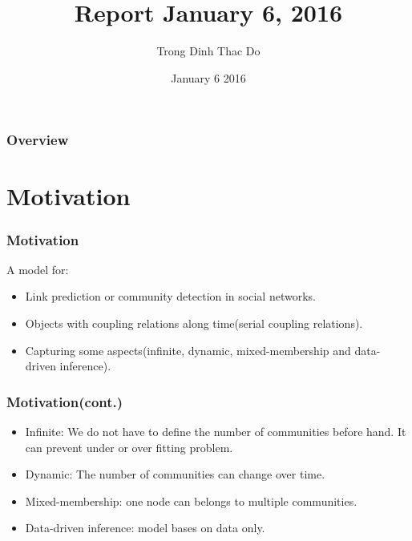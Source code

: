 \documentclass{beamer}
\title[LFRMtimes]{Report January 6, 2016} %
\author{Trong Dinh Thac Do} %
\institute[AAI] %
{
University of Technology Sydney \\ %
\medskip
\textit{trongdinhthac.do@student.uts.edu.au} %
}
\date{January 6 2016} %
\begin{document}
\begin{frame}
\titlepage %
\end{frame}

\begin{frame}
\frametitle{Overview} %
\tableofcontents %
\end{frame}


\section{Motivation} %

\begin{frame}
\frametitle{Motivation}
A model for:
\begin{itemize}
\item Link prediction or community detection in social networks.
\item Objects with coupling relations along time(serial coupling relations).
\item Capturing some aspects(infinite, dynamic, mixed-membership and data-driven inference).
\end{itemize}
\end{frame}


\begin{frame}
\frametitle{Motivation(cont.)}
\begin{itemize}
\item Infinite: We do not have to define the number of communities before hand. It can prevent under or over fitting problem.
\item Dynamic: The number of communities can change over time.
\item Mixed-membership: one node can belongs to multiple communities.
\item Data-driven inference: model bases on data only.
\end{itemize}
\end{frame}
\end{document}

